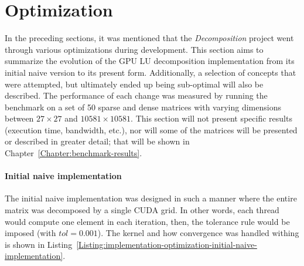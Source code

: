 \section{Optimization \TO}\label{Section:implementation-optimization}
In the preceding sections, it was mentioned that the \textit{Decomposition} project went through various optimizations during development. This section aims to summarize the evolution of the GPU LU decomposition implementation from its initial naive version to its present form. Additionally, a selection of concepts that were attempted, but ultimately ended up being sub-optimal will also be described. The performance of each change was measured by running the benchmark on a set of 50 sparse and dense matrices with varying dimensions between $ 27 \times 27 $ and $ 10581 \times 10581 $. This section will not present specific results (execution time, bandwidth, etc.), nor will some of the matrices will be presented or described in greater detail; that will be shown in Chapter~\ref{Chapter:benchmark-results}.

\paragraph{Initial naive implementation}\label{Paragraph:implementation-optimization-initial-naive-implementation}
The initial naive implementation was designed in such a manner where the entire matrix was decomposed by a single CUDA grid. In other words, each thread would compute one element in each iteration, then, the tolerance rule would be imposed (with $ tol = 0.001 $). The kernel and how convergence was handled withing  is shown in Listing~\ref{Listing:implementation-optimization-initial-naive-implementation}.

